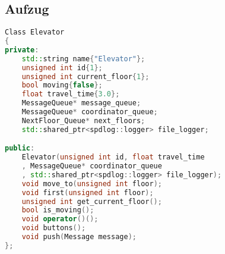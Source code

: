 \subsection{Aufzug}


\begin{lstlisting}[language=C++]
Class Elevator
{
private:
    std::string name{"Elevator"};
    unsigned int id{1};
    unsigned int current_floor{1};
    bool moving{false};
    float travel_time{3.0};
    MessageQueue* message_queue;
    MessageQueue* coordinator_queue;
    NextFloor_Queue* next_floors;
    std::shared_ptr<spdlog::logger> file_logger;

public:
    Elevator(unsigned int id, float travel_time
    , MessageQueue* coordinator_queue
    , std::shared_ptr<spdlog::logger> file_logger);
    void move_to(unsigned int floor);
    void first(unsigned int floor);
    unsigned int get_current_floor();
    bool is_moving();
    void operator()();
    void buttons();
    void push(Message message);
};
\end{lstlisting}

\vspace{5mm}

